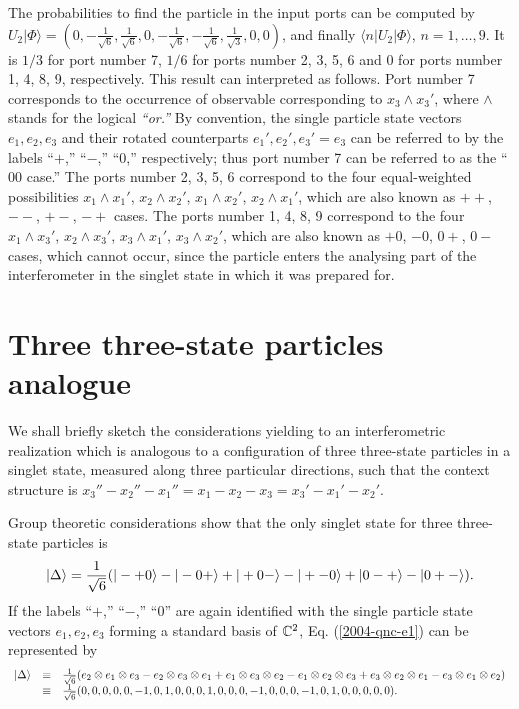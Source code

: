 \documentclass[pra,showpacs,showkeys,amsfonts]{revtex4}
\begin{document}
The probabilities to find the particle in the input ports can be computed by
$U_{2}\vert \Phi \rangle=
( 0,
-\frac{1}{{\sqrt{6}}}  ,
  \frac{1}{{\sqrt{6}}},
0,
-\frac{1}{{\sqrt{6}}}  ,
- \frac{1}{{\sqrt{6}}}  ,
  \frac{1}{{\sqrt{3}}},
0,
0)$, and finally
$\langle n \vert U_{2}\vert \Phi \rangle$, $n=1,\ldots ,9$.
It is $1/3$ for port number 7,
$1/6$ for ports number 2,  3, 5, 6
and $0$  for ports number 1, 4, 8, 9, respectively.
This result can interpreted as follows.
Port number 7 corresponds to the occurrence of observable corresponding to
$x_3\wedge x_3'$, where $\wedge$ stands for the logical {\em ``or.''}
By convention, the single particle state vectors
$e_1,e_2,e_3$
and their rotated counterparts
$e_1',e_2',e_3'=e_3$
can be referred to by the labels
``$+$,''
``$-$,''
``$0$,''
respectively;
thus
port number 7 can be referred to as the ``$00$ case.''
The ports number 2,  3, 5, 6 correspond to the four equal-weighted possibilities
$x_1\wedge x_1'$,
$x_2\wedge x_2'$,
$x_1\wedge x_2'$,
$x_2\wedge x_1'$,
which are also known as $++$, $--$, $+-$, $-+$ cases.
The ports number 1, 4, 8, 9 correspond to the four
$x_1\wedge x_3'$,
$x_2\wedge x_3'$,
$x_3\wedge x_1'$,
$x_3\wedge x_2'$,
which are also known as $+0$, $-0$, $0+$, $0-$ cases,
which cannot occur, since the particle enters the analysing part
of the interferometer in the singlet state in which it was prepared for.


\section{Three three-state particles analogue}

We shall briefly sketch the considerations yielding to an interferometric realization
which is analogous to a configuration of three three-state particles in a singlet state,
measured along three particular directions, such that
the context structure is $x_3''-x_2''-x_1''=x_1-x_2-x_3=x_3'-x_1'-x_2'$.

Group theoretic considerations \cite{2004-kasper-svo,kok-02}
show that the only singlet state for three three-state particles is
\begin{equation}
\vert \Delta \rangle
= {1\over \sqrt{6}}(
\vert - + 0\rangle
-
\vert - 0 +\rangle
+
\vert + 0 - \rangle
-
\vert + - 0\rangle
+
\vert 0 - + \rangle
-
\vert 0 + - \rangle
).
\label{2004-qnc-e1}
\end{equation}
If the labels
``$+$,''
``$-$,''
``$0$''
are again identified with the single particle state vectors
$e_1,e_2,e_3$ forming a standard basis of ${\Bbb C}^2$,
Eq. (\ref{2004-qnc-e1}) can be represented by
\begin{equation}
\begin{array}{ccl}
\vert \Delta \rangle
&\equiv& {1\over \sqrt{6}}(
 e_2 \otimes e_1 \otimes  e_3
-
 e_2 \otimes  e_3 \otimes  e_1
+
 e_1 \otimes  e_3 \otimes  e_2
-
 e_1 \otimes  e_2 \otimes  e_3
+
 e_3  \otimes e_2  \otimes e_1
-
 e_3 \otimes  e_1 \otimes  e_2
)
\\
&\equiv&
{1\over \sqrt{6}}
(0, 0, 0, 0, 0, -1, 0, 1, 0, 0, 0, 1, 0, 0, 0, -1, 0, 0, 0, -1, 0, 1, 0, 0, 0, 0, 0)
.
\end{array}
\label{2004-qnc-e1r}
\end{equation}
\end{document}
